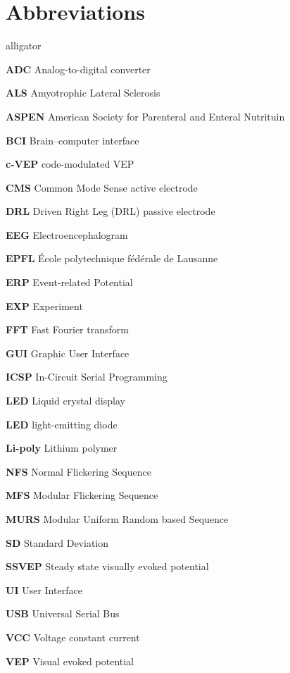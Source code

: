 \chapter*{Abbreviations}
\begin{labeling}{alligator}
	\item[\textbf{ADC}]	Analog-to-digital converter
	\item[\textbf{ALS}]	Amyotrophic Lateral Sclerosis
	\item[\textbf{ASPEN}] American Society for Parenteral and Enteral Nutrituin
	\item[\textbf{BCI}] Brain–computer interface
	\item[\textbf{c-VEP}] code-modulated VEP
	\item[\textbf{CMS}] Common Mode Sense active electrode
	\item[\textbf{DRL}]  Driven Right Leg (DRL) passive electrode
	\item[\textbf{EEG}] Electroencephalogram
	\item[\textbf{EPFL}] École polytechnique fédérale de Lausanne
	\item[\textbf{ERP}] Event-related Potential
	\item[\textbf{EXP}] Experiment
	\item[\textbf{FFT}] Fast Fourier transform
	\item[\textbf{GUI}] Graphic User Interface
	\item[\textbf{ICSP}]In-Circuit Serial Programming
	\item[\textbf{LED}] Liquid crystal display
	\item[\textbf{LED}] light-emitting diode
	\item[\textbf{Li-poly}] Lithium polymer
	\item[\textbf{NFS}] Normal Flickering Sequence 
	\item[\textbf{MFS}] Modular Flickering Sequence 
	\item[\textbf{MURS}] Modular Uniform Random based Sequence 
	\item[\textbf{SD}] Standard Deviation
	\item[\textbf{SSVEP}] Steady state visually evoked potential
	\item[\textbf{UI}] User Interface
	\item[\textbf{USB}] Universal Serial Bus
	\item[\textbf{VCC}] Voltage constant current 
	\item[\textbf{VEP}] Visual evoked potential
	
\end{labeling}